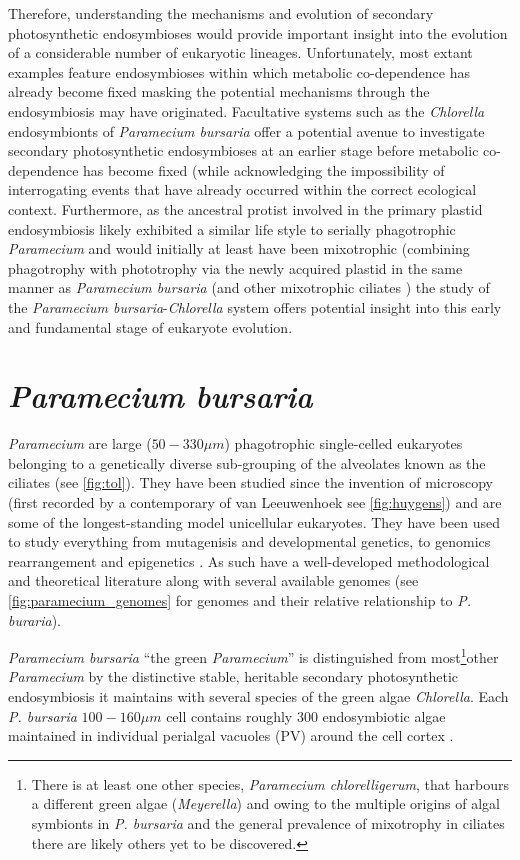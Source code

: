 Therefore, understanding the mechanisms and evolution of secondary photosynthetic endosymbioses would provide important insight into the evolution of a considerable number of eukaryotic lineages.  Unfortunately, most extant examples feature endosymbioses within which metabolic co-dependence has already become fixed
masking the potential mechanisms through the endosymbiosis may have originated.  
Facultative systems such as the \textit{Chlorella} endosymbionts of \textit{Paramecium bursaria} offer a potential avenue to investigate secondary 
photosynthetic endosymbioses at an earlier stage before metabolic co-dependence has become fixed (while acknowledging the impossibility of 
interrogating events that have already occurred within the correct ecological context.
Furthermore, as the ancestral protist involved in the primary plastid endosymbiosis likely exhibited a similar life style to serially phagotrophic
\textit{Paramecium} and would initially at least have been mixotrophic (combining phagotrophy with phototrophy via the newly acquired plastid \citep{Rockwell2014} in the same manner as \textit{Paramecium bursaria} (and other mixotrophic ciliates \citep{Johnson2011}) the study of the \textit{Paramecium bursaria}-\textit{Chlorella} system offers potential insight into this early and fundamental stage of eukaryote evolution.

\section{\textit{Paramecium bursaria}}
\textit{Paramecium} are large (\(50-330\mu m\)) phagotrophic single-celled eukaryotes belonging %
to a genetically diverse \citep{Prescott1994} sub-grouping of the alveolates known as the ciliates (see \ref{fig:tol}).
They have been studied since the invention of microscopy \citep{Gortz2009} (first recorded by a contemporary of van Leeuwenhoek 
see \ref{fig:huygens}) and are some of the longest-standing model unicellular eukaryotes.  They have been used
to study everything from mutagenisis and developmental genetics, to genomics rearrangement and epigenetics \citep{McGrath2014}. 
As such have a well-developed methodological \citep{Sonneborn1970} and theoretical literature along with 
several available genomes (see \ref{fig:paramecium_genomes} for genomes and their relative relationship to \textit{P. buraria}). %

\textit{Paramecium bursaria} ``the green \textit{Paramecium}'' is distinguished from most\footnote{
    There is at least one other species, \textit{Paramecium chlorelligerum}, that harbours a different green algae (\textit{Meyerella}) \citep{Kreutz2012}
    and owing to the multiple origins of algal symbionts in \textit{P. bursaria} \citep{Hoshina2009} and the general prevalence of mixotrophy
    in ciliates \citep{Johnson2011} there are likely others yet to be discovered.
}other \textit{Paramecium} by the distinctive stable, heritable secondary photosynthetic endosymbiosis it maintains with several species of 
the green algae \textit{Chlorella}.  
Each \textit{P. bursaria} \(100-160\mu m\) \citep{Jennings1939} cell contains roughly 300 endosymbiotic algae maintained in individual perialgal vacuoles (PV) around the cell cortex \citep{Hoshina2009}.

